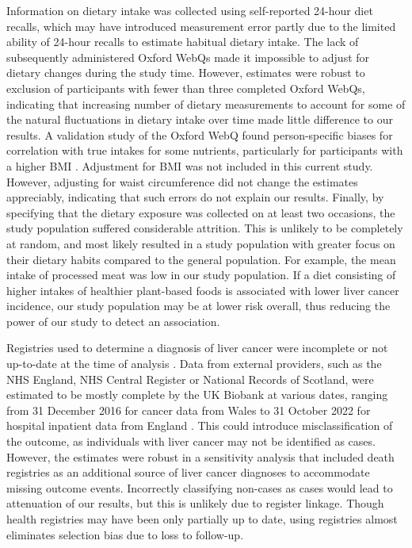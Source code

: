 \documentclass[nutrients,article,submit,moreauthors,pdftex]{Definitions/mdpi}
\begin{document}
Information on dietary intake was collected using self-reported 24-hour
diet recalls, which may have introduced measurement error partly due to
the limited ability of 24-hour recalls to estimate habitual dietary
intake. The lack of subsequently administered Oxford WebQs made it
impossible to adjust for dietary changes during the study time. However,
estimates were robust to exclusion of participants with fewer than three
completed Oxford WebQs, indicating that increasing number of dietary
measurements to account for some of the natural fluctuations in dietary
intake over time made little difference to our results. A validation
study of the Oxford WebQ found person-specific biases for correlation
with true intakes for some nutrients, particularly for participants with
a higher BMI \citep{Greenwood2019}. Adjustment for BMI was not included in
this current study. However, adjusting for waist circumference did not
change the estimates appreciably, indicating that such errors do not
explain our results. Finally, by specifying that the dietary exposure
was collected on at least two occasions, the study population suffered
considerable attrition. This is unlikely to be completely at random, and
most likely resulted in a study population with greater focus on their
dietary habits compared to the general population. For example, the mean
intake of processed meat was low in our study population. If a diet
consisting of higher intakes of healthier plant-based foods is
associated with lower liver cancer incidence, our study population may
be at lower risk overall, thus reducing the power of our study to detect
an association.

Registries used to determine a diagnosis of liver cancer were incomplete
or not up-to-date at the time of analysis \citep{RN112}. Data from external
providers, such as the NHS England, NHS Central Register or National
Records of Scotland, were estimated to be mostly complete by the UK
Biobank at various dates, ranging from 31 December 2016 for cancer data
from Wales to 31 October 2022 for hospital inpatient data from England
\citep{RN114}. This could introduce misclassification of the outcome, as
individuals with liver cancer may not be identified as cases. However,
the estimates were robust in a sensitivity analysis that included death
registries as an additional source of liver cancer diagnoses to
accommodate missing outcome events. Incorrectly classifying non-cases as
cases would lead to attenuation of our results, but this is unlikely due
to register linkage. Though health registries may have been only
partially up to date, using registries almost eliminates selection bias
due to loss to follow-up.
\end{document}
